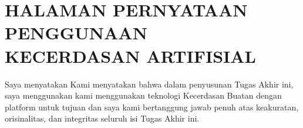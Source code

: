 %
%

\chapter*{\uppercase{Halaman Pernyataan Penggunaan\\Kecerdasan Artifisial}}
\vspace*{1.5cm}
\pagestyle{onlypage}

\begin{bfseries}
\noindent
\ifx\blank\npmDua
Saya menyatakan
\else
Kami menyatakan
\fi
bahwa dalam penyusunan Tugas Akhir ini,
\ifx\blank\npmDua
saya menggunakan
\else
kami menggunakan
\fi
teknologi Kecerdasan Buatan dengan platform \platformAI{} untuk tujuan
\tujuanPenggunaanAI{} dan
\ifx\blank\npmDua
saya
\else
kami
\fi
bertanggung jawab penuh atas keakuratan, orisinalitas, dan integritas seluruh
isi Tugas Akhir ini.
\end{bfseries}

\vspace*{1.5cm}

